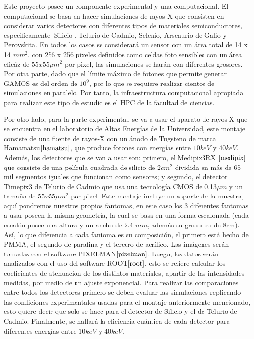 \documentclass[12pt]{article}
\begin{document}
Este proyecto posee un componente experimental y una computacional. El computacional se basa en hacer simulaciones de rayos-X que consisten en considerar varios detectores con diferentes tipos de materiales semiconductores, especificamente: Silicio , Telurio de Cadmio, Selenio, Arsenurio de Galio y Perovskita. En todos los casos se considerará un sensor con un área total de 14 x 14 $mm^{2}$, con 256 x 256 pixeles definidos como celdas foto sensibles con un área eficáz de $55 x 55\mu m^2 $ por pixel, las simulaciones se harán con diferentes grosores. Por otra parte, dado que el límite máximo de fotones que permite generar GAMOS es del orden de $10^9$, por lo que se requiere realizar cientos de simulaciones en paralelo. Por tanto, la infraestructura computacional apropiada para realizar este tipo de estudio es el HPC de la facultad de ciencias.

\vspace{3cm}  
Por otro lado, para la parte experimental, se va a usar el aparato de rayos-X que se encuentra en el laboratorio de Altas Energías de la Universidad, este montaje consiste de una fuente de rayos-X con un ánodo de Tugsteno de marca Hamamatsu$\cite{hamatsu}$, que produce fotones con energías entre $10 keV$ y $40keV$. Además, los detectores que se van a usar son: primero, el Medipix3RX $\cite{medipix}$ que consiste de una película cuadrada de silicio de $2cm^2$ dividida en más de 65 mil segmentos iguales que funcionan como sensores; y segundo, el detector Timepix3 de Telurio de Cadmio que usa una tecnología CMOS de 0.13$\mu m$ y un tamaño de $55 x 55\mu m^2 $ por pixel. Este montaje incluye un soporte de la muestra, aquí pondremos nuestros propios fantomas, en este caso los 3 diferentes fantomas a usar poseen la misma geometría, la cual se basa en una forma escalonada (cada escalón posee una altura y un ancho de 2.4 $mm$, además su grosor es de 8cm).  
Así, lo que diferencia a cada fantoma es su composición, el primero está hecho de PMMA, el segundo de parafina y el tercero de acrílico. Las imágenes serán tomadas con el software PIXELMAN$\cite{pixelman}$. Luego, los datos serán analizados con el uso del software ROOT$\cite{root}$, esto se refiere calcular los coeficientes de atenuación de los distintos materiales, apartir de las intensidades medidas, por medio de un ajuste exponencial.   
Para realizar las comparaciones entre todos los detectores primero se deben evaluar las simulaciones replicando las condiciones experimentales usadas para el montaje anteriormente mencionado, esto quiere decir que solo se hace para el detector de Silicio y el de Telurio de Cadmio. Finalmente, se hallará la eficiencia cuántica de cada detector para diferentes energías entre $10keV$ y $40keV$. 
 
\end{document}
